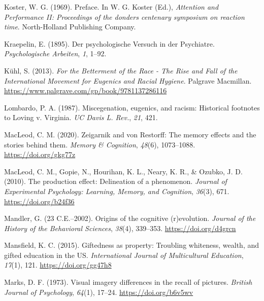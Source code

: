 \documentclass[
  oneside,
  12pt]{crumpbook}
\newlength{\cslhangindent}
\newlength{\cslentryspacingunit} %
\newenvironment{CSLReferences}[2] %
 {%
  \setlength{\parindent}{0pt}
  \ifodd #1
  \let\oldpar\par
  \def\par{\hangindent=\cslhangindent\oldpar}
  \fi
  \setlength{\parskip}{#2\cslentryspacingunit}
 }%
 {}
\begin{document}
\begin{CSLReferences}{1}{0}
\leavevmode{}%
Koster, W. G. (1969). Preface. In W. G. Koster (Ed.), \emph{Attention and {Performance II}: Proceedings of the donders centenary symposium on reaction time}. {North-Holland Publishing Company}.

\leavevmode{}%
Kraepelin, E. (1895). Der psychologische {Versuch} in der {Psychiatre}. \emph{Psychologische Arbeiten}, \emph{1}, 1--92.

\leavevmode{}%
Kühl, S. (2013). \emph{For the {Betterment} of the {Race} - {The Rise} and {Fall} of the {International Movement} for {Eugenics} and {Racial Hygiene}}. {Palgrave Macmillan}. \url{https://www.palgrave.com/gp/book/9781137286116}

\leavevmode{}%
Lombardo, P. A. (1987). Miscegenation, eugenics, and racism: {Historical} footnotes to {Loving} v. {Virginia}. \emph{UC Davis L. Rev.}, \emph{21}, 421.

\leavevmode{}%
MacLeod, C. M. (2020). Zeigarnik and von {Restorff}: {The} memory effects and the stories behind them. \emph{Memory \& Cognition}, \emph{48}(6), 1073--1088. \url{https://doi.org/gkg77z}

\leavevmode{}%
MacLeod, C. M., Gopie, N., Hourihan, K. L., Neary, K. R., \& Ozubko, J. D. (2010). The production effect: Delineation of a phenomenon. \emph{Journal of Experimental Psychology: Learning, Memory, and Cognition}, \emph{36}(3), 671. \url{https://doi.org/b24f36}

\leavevmode{}%
Mandler, G. (23 C.E.--2002). Origins of the cognitive (r)evolution. \emph{Journal of the History of the Behavioral Sciences}, \emph{38}(4), 339--353. \url{https://doi.org/d4grcn}

\leavevmode{}%
Mansfield, K. C. (2015). Giftedness as property: {Troubling} whiteness, wealth, and gifted education in the {US}. \emph{International Journal of Multicultural Education}, \emph{17}(1), 121. \url{https://doi.org/gg47h8}

\leavevmode{}%
Marks, D. F. (1973). Visual imagery differences in the recall of pictures. \emph{British Journal of Psychology}, \emph{64}(1), 17--24. \url{https://doi.org/b6v5wv}


\end{CSLReferences}
\end{document}
